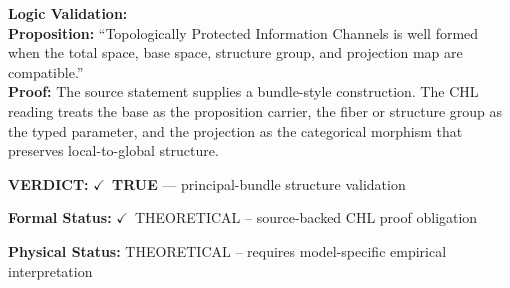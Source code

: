 \textbf{Logic Validation:}\\
\textbf{Proposition:} ``Topologically Protected Information Channels is well formed when the total space, base
space, structure group, and projection map are compatible.''\\
\textbf{Proof:} The source statement supplies a bundle-style construction. The CHL reading treats the
base as the proposition carrier, the fiber or structure group as the typed parameter,
and the projection as the categorical morphism that preserves local-to-global structure.

\textbf{VERDICT:} \ensuremath{\checkmark}\ \textbf{TRUE} --- principal-bundle structure validation

\textbf{Formal Status:} \ensuremath{\checkmark}\ THEORETICAL -- source-backed CHL proof obligation

\textbf{Physical Status:} THEORETICAL -- requires model-specific empirical interpretation
\par\vspace{0.45em}
\par
\ifTZPDarkEdition
{}
\fi
\endgroup
\endgroup
